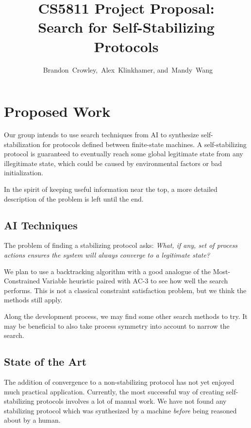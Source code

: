 


\usepackage{tikz}
\usetikzlibrary{arrows}


\title{
 CS5811 Project Proposal:\\
 Search for Self-Stabilizing Protocols
}

\author{~Brandon~Crowley,~Alex~Klinkhamer, and~Mandy~Wang}
\maketitle


\section{Proposed Work}

Our group intends to use search techniques from AI to synthesize self-stabilization for protocols defined between finite-state machines.
A self-stabilizing protocol is guaranteed to eventually reach some global legitimate state from any illegitimate state, which could be caused by environmental factors or bad initialization.

In the spirit of keeping useful information near the top, a more detailed description of the problem is left until the end.

\subsection{AI Techniques}

The problem of finding a stabilizing protocol asks: {\em What, if any, set of process actions ensures the system will always converge to a legitimate state?}

We plan to use a backtracking algorithm with a good analogue of the Most-Constrained Variable heuristic paired with AC-3 to see how well the search performs.
This is not a classical constraint satisfaction problem, but we think the methods still apply.

Along the development process, we may find some other search methods to try.
It may be beneficial to also take process symmetry into account to narrow the search.

\subsection{State of the Art}

The addition of convergence to a non-stabilizing protocol has not yet enjoyed much practical application.
Currently, the most successful way of creating self-stabilizing protocols involves a lot of manual work.
We have not found any stabilizing protocol which was synthesized by a machine {\em before} being reasoned about by a human.

